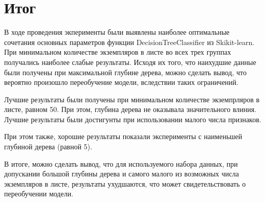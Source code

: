 \documentclass[a4paper,12pt]{article}
\begin{document}
\newpage\section{Итог}
	В ходе проведения экперименты были выявлены наиболее оптимальные сочетания основных параметров функции DecisionTreeClassifier из Skikit-learn. При минимальном количестве экземпляров в листе во всех трех группах получались наиболее слабые результаты. Исходя их того, что наихудшие данные были получены при максимальной глубине дерева, можно сделать вывод, что вероятно произошло переобучение модели, вследствии таких ограничений. 
	
	\vspace{0.5cm}
	Лучшие результаты были получены при минимальном количестве экземпрляров в листе, равном 50. При этом, глубина дерева не оказывала значительного влиния. Лучшие результаты были достигунты при использовании малого числа признаков. 
	
	\vspace{0.5cm}
	При этом также, хорошие результаты показали эксперименты с наименьшей глубиной дерева (равной 5).
	
	\vspace{0.5cm}
	В итоге, можно сделать вывод, что для используемого набора данных, при допускании большой глубины дерева и самого малого из возможных числа экземпляров в листе, результаты ухудшаются, что может свидетельствовать о переобучении модели.
	
	
\end{document}
